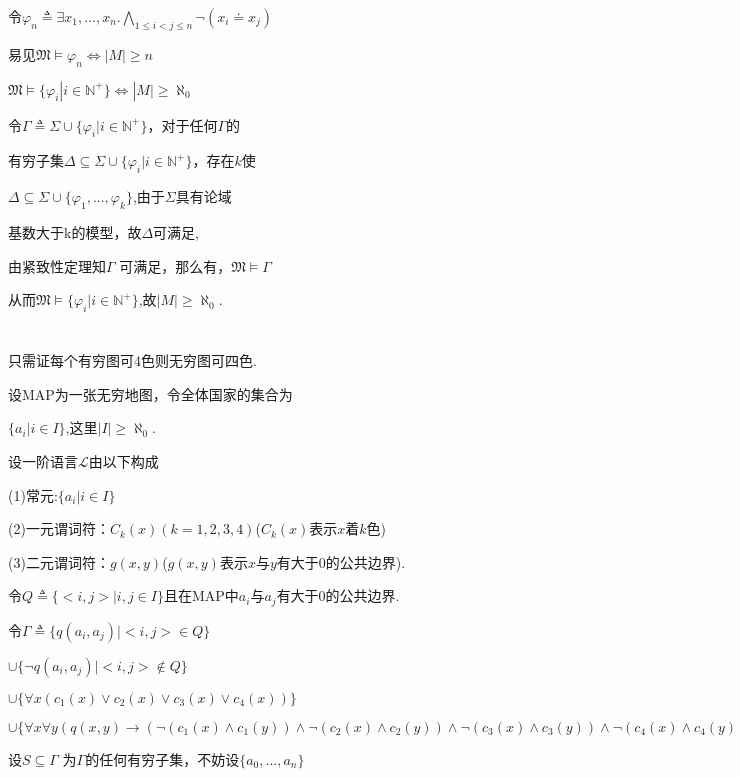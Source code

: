 \documentclass{article}
\begin{document}
令$\varphi_n \triangleq \exists x_1,...,x_n. \bigwedge_{1\leq i < j\leq n} \neg (x_i \doteq x_j)$

易见$\mathfrak{M} \models \varphi_n \Leftrightarrow |M|\geq n$

$\mathfrak{M} \models \{ \varphi_i | i\in \mathbb{N}^+ \} \Leftrightarrow |M|\geq \aleph_0$

令$\Gamma \triangleq \Sigma \cup \{ \varphi_i | i \in \mathbb{N}^+ \}$，对于任何$\Gamma$的

有穷子集$\Delta \subseteq \Sigma \cup \{ \varphi_i | i  \in \mathbb{N}^+ \} $，存在$k$使

$\Delta \subseteq \Sigma \cup \{ \varphi_1 ,..., \varphi_k\} $,由于$\Sigma$具有论域

基数大于k的模型，故$\Delta$可满足,

由紧致性定理知$\Gamma$ 可满足，那么有，$\mathfrak{M}\vDash \Gamma$

从而$\mathfrak{M} \vDash \{ \varphi_i | i  \in \mathbb{N}^+\}$,故$|M|\geq \aleph_0$.


\section{}

只需证每个有穷图可4色则无穷图可四色.

设MAP为一张无穷地图，令全体国家的集合为

$\{a_i |i\in I\}$,这里$|I|\geq \aleph_0$.

设一阶语言$\mathcal{L}$由以下构成

(1)常元:$\{a_i | i\in I\}$

(2)一元谓词符：$C_k (x) (k=1,2,3,4)$\quad($C_k (x)$表示$x$着$k$色)

(3)二元谓词符：$g(x,y)$\quad($g(x,y)$表示$x$与$y$有大于0的公共边界).

令$Q \triangleq \{<i,j>|i,j\in I\}$且在MAP中$a_i$与$a_j$有大于0的公共边界.

令$\Gamma \triangleq \{q(a_i,a_j) | <i,j> \in Q\}$

$\cup \{\neg q(a_i,a_j) | <i,j> \notin Q\}$

$\cup\{ \forall x(c_1(x)\vee c_2(x)\vee c_3(x)\vee c_4(x))\}$

$\cup\{ \forall x \forall y (q(x, y)\rightarrow (\neg (c_1(x)\wedge c_1(y))  \wedge \neg(c_2(x)\wedge c_2(y))\wedge \neg(c_3(x)\wedge c_3(y))\wedge \neg(c_4(x)\wedge c_4(y))))\}$

设$S\subseteq \Gamma$ 为$\Gamma$的任何有穷子集，不妨设$\{a_0,...,a_n\}$
\end{document}
